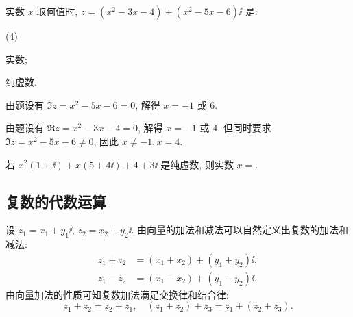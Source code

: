 \begin{example}
  实数 $x$ 取何值时, $z=(x^2-3x-4)+(x^2-5x-6)\ii$ 是:
  \begin{subexample}(4)
    \item 实数;
    \item 纯虚数.
  \end{subexample}
\end{example}

\begin{solutionenum}
  \item 由题设有 $\Im z=x^2-5x-6=0$, 解得 $x=-1$ 或 $6$.
  \item 由题设有 $\Re z=x^2-3x-4=0$, 解得 $x=-1$ 或 $4$.
  但同时要求 $\Im z=x^2-5x-6\neq 0$, 因此 $x\neq -1, x=4$.
\end{solutionenum}

\begin{exercise}
  若 $x^2(1+\ii)+x(5+4\ii)+4+3\ii$ 是纯虚数, 则实数 $x=$\fillblank{}.
\end{exercise}


\subsection{复数的代数运算}

设 $z_1=x_1+y_1\ii$, $z_2=x_2+y_2\ii$.
由向量的加法和减法可以自然定义出复数的加法和减法:
\begin{align*}
  z_1+z_2&=(x_1+x_2)+(y_1+y_2)\ii,\\
  z_1-z_2&=(x_1-x_2)+(y_1-y_2)\ii.
\end{align*}
由向量加法的性质可知复数加法满足交换律和结合律:
\[
  z_1+z_2=z_2+z_1,\quad (z_1+z_2)+z_3=z_1+(z_2+z_3).
\]

